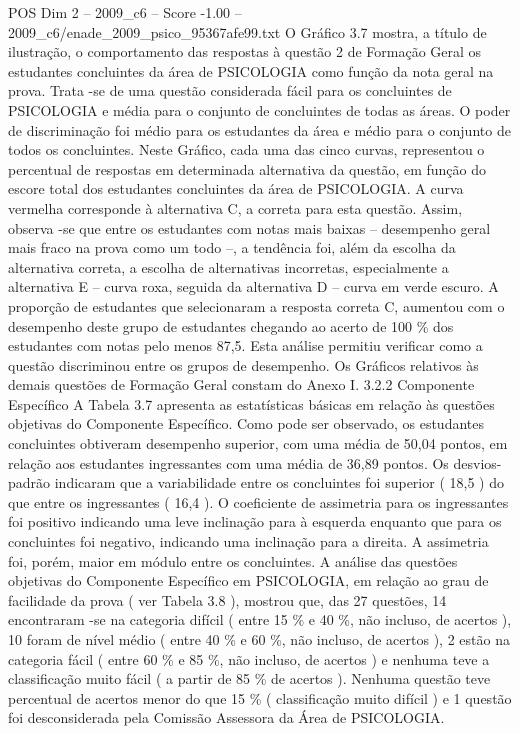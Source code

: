 \begin{textsample}{POS Dim 2 – 2009\_c6 – Score -1.00 – 2009\_c6/enade\_2009\_psico\_95367afe99.txt}
O Gráfico 3.7 mostra, a título de ilustração, o comportamento das respostas à questão 2 de Formação Geral os estudantes concluintes da área de PSICOLOGIA como função da nota geral na prova.
Trata -se de uma questão considerada fácil para os concluintes de PSICOLOGIA e média para o conjunto de concluintes de todas as áreas.
O poder de discriminação foi médio para os estudantes da área e médio para o conjunto de todos os concluintes.
Neste Gráfico, cada uma das cinco curvas, representou o percentual de respostas em determinada alternativa da questão, em função do escore total dos estudantes concluintes da área de PSICOLOGIA.
A curva vermelha corresponde à alternativa C, a correta para esta questão.
Assim, observa -se que entre os estudantes com notas mais baixas – desempenho geral mais fraco na prova como um todo –, a tendência foi, além da escolha da alternativa correta, a escolha de alternativas incorretas, especialmente a alternativa E – curva roxa, seguida da alternativa D – curva em verde escuro.
A proporção de estudantes que selecionaram a resposta correta C, aumentou com o desempenho deste grupo de estudantes chegando ao acerto de 100 \% dos estudantes com notas pelo menos 87,5.
Esta análise permitiu verificar como a questão discriminou entre os grupos de desempenho.
Os Gráficos relativos às demais questões de Formação Geral constam do Anexo I. 3.2.2 Componente Específico A Tabela 3.7 apresenta as estatísticas básicas em relação às questões objetivas do Componente Específico.
Como pode ser observado, os estudantes concluintes obtiveram desempenho superior, com uma média de 50,04 pontos, em relação aos estudantes ingressantes com uma média de 36,89 pontos.
Os desvios-padrão indicaram que a variabilidade entre os concluintes foi superior ( 18,5 ) do que entre os ingressantes ( 16,4 ).
O coeficiente de assimetria para os ingressantes foi positivo indicando uma leve inclinação para à esquerda enquanto que para os concluintes foi negativo, indicando uma inclinação para a direita.
A assimetria foi, porém, maior em módulo entre os concluintes.
A análise das questões objetivas do Componente Específico em PSICOLOGIA, em relação ao grau de facilidade da prova ( ver Tabela 3.8 ), mostrou que, das 27 questões, 14 encontraram -se na categoria difícil ( entre 15 \% e 40 \%, não incluso, de acertos ), 10 foram de nível médio ( entre 40 \% e 60 \%, não incluso, de acertos ), 2 estão na categoria fácil ( entre 60 \% e 85 \%, não incluso, de acertos ) e nenhuma teve a classificação muito fácil ( a partir de 85 \% de acertos ).
Nenhuma questão teve percentual de acertos menor do que 15 \% ( classificação muito difícil ) e 1 questão foi desconsiderada pela Comissão Assessora da Área de PSICOLOGIA.

\end{textsample}
